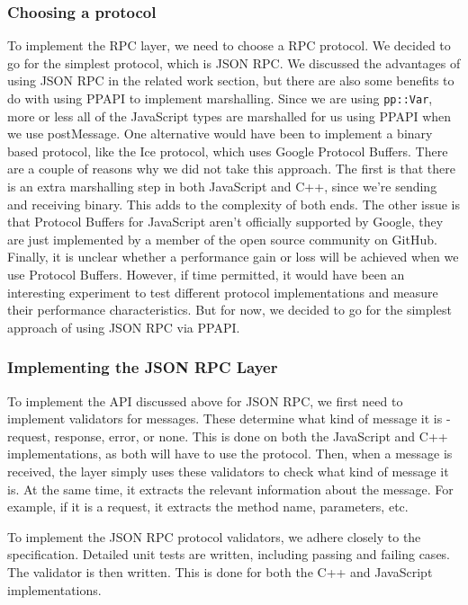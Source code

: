 \subsubsection{Choosing a protocol} %
\label{ssub:choosing_a_protocol}
To implement the RPC layer, we need to choose a RPC protocol. We decided to go for the simplest protocol, which is JSON RPC. We discussed the advantages of using JSON RPC in the related work section, but there are also some benefits to do with using PPAPI to implement marshalling. Since we are using \lstinline{pp::Var}, more or less all of the JavaScript types are marshalled for us using PPAPI when we use postMessage. One alternative would have been to implement a binary based protocol, like the Ice protocol, which uses Google Protocol Buffers. There are a couple of reasons why we did not take this approach. The first is that there is an extra marshalling step in both JavaScript and C++, since we're sending and receiving binary. This adds to the complexity of both ends. The other issue is that Protocol Buffers for JavaScript aren't officially supported by Google, they are just implemented by a member of the open source community on GitHub. Finally, it is unclear whether a performance gain or loss will be achieved when we use Protocol Buffers. However, if time permitted, it would have been an interesting experiment to test different protocol implementations and measure their performance characteristics. But for now, we decided to go for the simplest approach of using JSON RPC via PPAPI.

\subsubsection{Implementing the JSON RPC Layer} %
\label{ssub:implementing_the_jsonrpc_layer}
To implement the API discussed above for JSON RPC, we first need to implement validators for messages. These determine what kind of message it is - request, response, error, or none. This is done on both the JavaScript and C++ implementations, as both will have to use the protocol. Then, when a message is received, the layer simply uses these validators to check what kind of message it is. At the same time, it extracts the relevant information about the message. For example, if it is a request, it extracts the method name, parameters, etc. 

To implement the JSON RPC protocol validators, we adhere closely to the specification. Detailed unit tests are written, including passing and failing cases. The validator is then written. This is done for both the C++ and JavaScript implementations.

